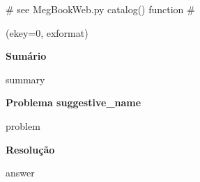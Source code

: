 {# see MegBookWeb.py catalog() function #}


\bigskip

  (ekey=0, {{exformat}})

\textbf{Sumário}

\begin{spverbatim}
{{summary}}
\end{spverbatim}

\textbf{Problema {{suggestive_name}}  }

{{problem}}

\textbf{Resolução}

{{answer}}




